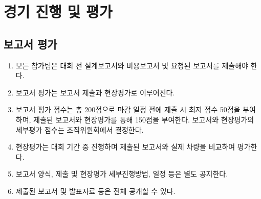 \documentclass[final,a4paper,10pt]{report}
\begin{document}
\chapter{경기 진행 및 평가}

\section{보고서 평가}\label{rule:formula-competition.report-evaluation}
\begin{enumerate}
  \item\label{rule:formula-competition.report-evaluation.design-cost-report-submission} 모든 참가팀은 대회 전 설계보고서와 비용보고서 및 요청된 보고서를 제출해야 한다.
  \item\label{rule:formula-competition.report-evaluation.submission-and-onsite-evaluation} 보고서 평가는 보고서 제출과 현장평가로 이루어진다.
  \item\label{rule:formula-competition.report-evaluation.total-200pt-breakdown} 보고서 평가 점수는 총 200점으로 마감 일정 전에 제출 시 최저 점수 50점을 부여하며, 제출된 보고서와 현장평가를 통해 150점을 부여한다. 보고서와 현장평가의 세부평가 점수는 조직위원회에서 결정한다.
  \item\label{rule:formula-competition.report-evaluation.onsite-report-vs-car} 현장평가는 대회 기간 중 진행하며 제출된 보고서와 실제 차량을 비교하여 평가한다.
  \item\label{rule:formula-competition.report-evaluation.format-and-schedule-announced} 보고서 양식, 제출 및 현장평가 세부진행방법, 일정 등은 별도 공지한다.
  \item\label{rule:formula-competition.report-evaluation.reports-may-be-published} 제출된 보고서 및 발표자료 등은 전체 공개할 수 있다.
\end{enumerate}
\end{document}

